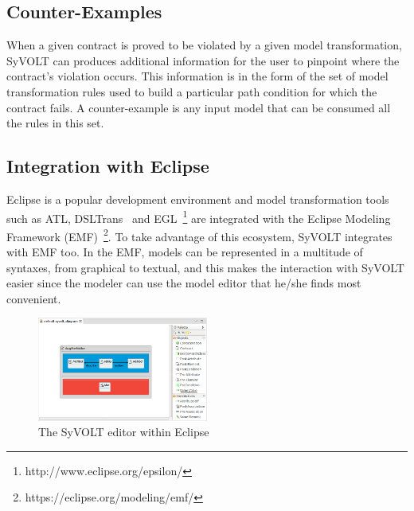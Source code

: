 \subsection{Counter-Examples}

When a given contract is proved to be violated by a given model transformation,
SyVOLT can produces additional information for the user to pinpoint where
the contract's violation occurs. This information is in
the form of the set of model transformation rules used to build a particular
path condition for which the contract fails. A counter-example is any input model that can be
consumed all the rules in this set.



\subsection{Integration with Eclipse}

Eclipse is a popular development environment and model transformation
tools such as ATL, DSLTrans~\cite{Barroca2011} and
EGL~\footnote{http://www.eclipse.org/epsilon/} are integrated with the Eclipse Modeling Framework
(EMF)~\footnote{https://eclipse.org/modeling/emf/}. To take advantage of this
ecosystem, SyVOLT integrates with EMF too. In the EMF, models can be represented in a multitude of syntaxes, from
graphical to textual, and this makes the interaction with SyVOLT easier since the modeler
can use the model editor that he/she finds most convenient.



\begin{figure}
\centering
\includegraphics[width=0.5\textwidth]{figures/eclipse_frontend}
\caption{The SyVOLT editor within Eclipse}
\label{fig:eclipse_frontend}
\end{figure}




 